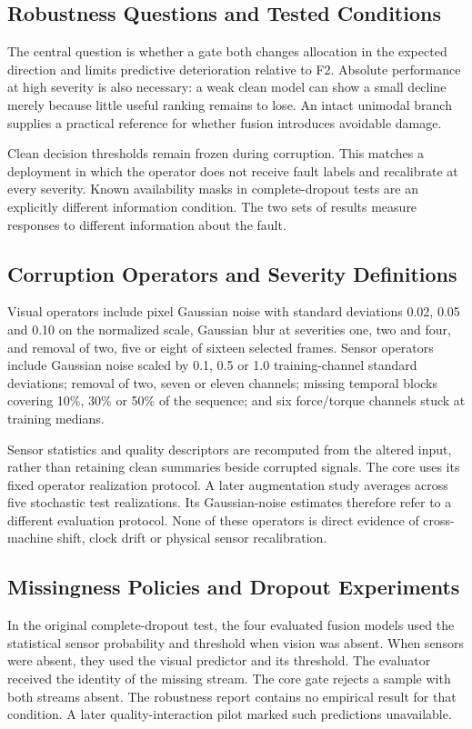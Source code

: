 \subsection{Robustness Questions and Tested Conditions}
The central question is whether a gate both changes allocation in the expected direction
and limits predictive deterioration relative to F2. Absolute performance at high
severity is also necessary: a weak clean model can show a small decline merely because
little useful ranking remains to lose. An intact unimodal branch supplies a practical
reference for whether fusion introduces avoidable damage.

Clean decision thresholds remain frozen during corruption. This matches a deployment in
which the operator does not receive fault labels and recalibrate at every severity.
Known availability masks in complete-dropout tests are an explicitly different
information condition. The two sets of results measure responses to different
information about the fault.

\subsection{Corruption Operators and Severity Definitions}
Visual operators include pixel Gaussian noise with standard deviations 0.02, 0.05 and
0.10 on the normalized scale, Gaussian blur at severities one, two and four, and removal
of two, five or eight of sixteen selected frames. Sensor operators include Gaussian
noise scaled by 0.1, 0.5 or 1.0 training-channel standard deviations; removal of two,
seven or eleven channels; missing temporal blocks covering 10\%, 30\% or 50\% of the
sequence; and six force/torque channels stuck at training medians.

Sensor statistics and quality descriptors are recomputed from the altered input, rather
than retaining clean summaries beside corrupted signals. The core uses its fixed
operator realization protocol. A later augmentation study averages across five
stochastic test realizations. Its Gaussian-noise estimates therefore refer to a
different evaluation protocol. None of these operators is direct evidence of
cross-machine shift, clock drift or physical sensor recalibration.

\subsection{Missingness Policies and Dropout Experiments}
In the original complete-dropout test, the four evaluated fusion models used the
statistical sensor probability and threshold when vision was absent. When sensors were
absent, they used the visual predictor and its threshold. The evaluator received the
identity of the missing stream. The core gate rejects a sample with both streams absent.
The robustness report contains no empirical result for that condition. A later
quality-interaction pilot marked such predictions unavailable.

